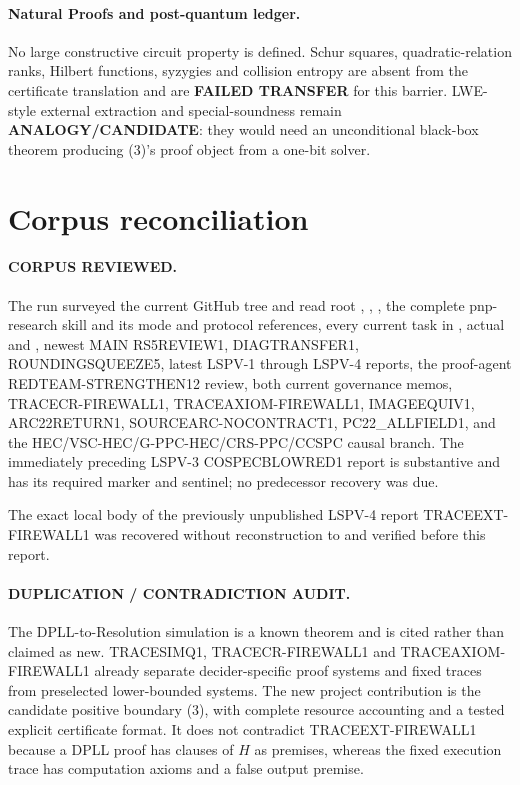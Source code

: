 \documentclass[11pt]{article}
\begin{document}
\paragraph{Natural Proofs and post-quantum ledger.}
No large constructive circuit property is defined.  Schur squares,
quadratic-relation ranks, Hilbert functions, syzygies and collision entropy
are absent from the certificate translation and are \textbf{FAILED TRANSFER}
for this barrier.  LWE-style external extraction and special-soundness remain
\textbf{ANALOGY/CANDIDATE}: they would need an unconditional black-box theorem
producing (3)'s proof object from a one-bit solver.

\section{Corpus reconciliation}
\paragraph{CORPUS REVIEWED.}
The run surveyed the current GitHub tree and read root ,
, , the complete pnp-research skill and its mode
and protocol references, every current task in , actual
 and , newest MAIN RS5REVIEW1, DIAGTRANSFER1,
ROUNDINGSQUEEZE5, latest LSPV-1 through LSPV-4 reports, the proof-agent
REDTEAM-STRENGTHEN12 review, both current governance memos, TRACECR-FIREWALL1,
TRACEAXIOM-FIREWALL1, IMAGEEQUIV1, ARC22RETURN1, SOURCEARC-NOCONTRACT1,
PC22\_ALLFIELD1, and the HEC/VSC-HEC/G-PPC-HEC/CRS-PPC/CCSPC causal branch.
The immediately preceding LSPV-3 COSPECBLOWRED1 report is substantive and has
its required marker and sentinel; no predecessor recovery was due.

The exact local body of the previously unpublished LSPV-4 report
TRACEEXT-FIREWALL1 was recovered without reconstruction to
and verified before this report.

\paragraph{DUPLICATION / CONTRADICTION AUDIT.}
The DPLL-to-Resolution simulation is a known theorem and is cited rather than
claimed as new.  TRACESIMQ1, TRACECR-FIREWALL1 and TRACEAXIOM-FIREWALL1 already
separate decider-specific proof systems and fixed traces from preselected
lower-bounded systems.  The new project contribution is the candidate positive
boundary (3), with complete resource accounting and a tested explicit
certificate format.  It does not contradict TRACEEXT-FIREWALL1 because a
DPLL proof has clauses of $H$ as premises, whereas the fixed execution trace
has computation axioms and a false output premise.
\end{document}
